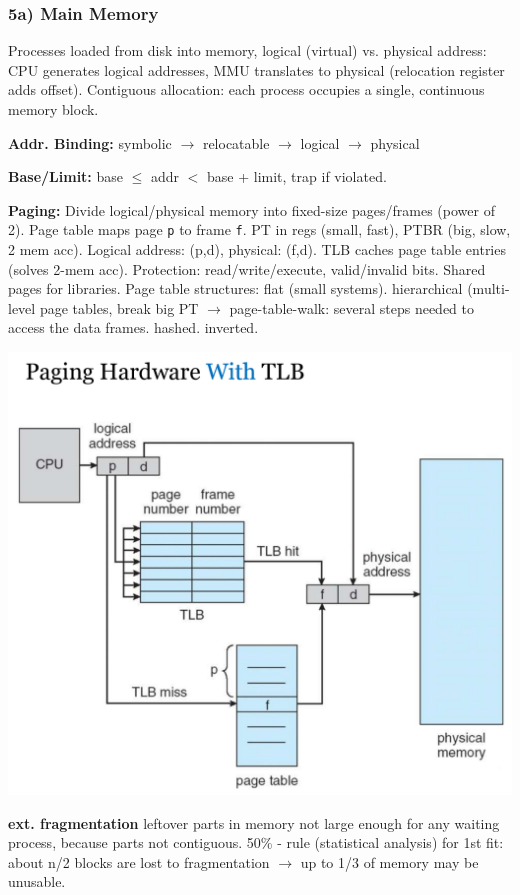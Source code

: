 \subsubsection*{5a) Main Memory}
Processes loaded from disk into memory, logical (virtual) vs. physical address: CPU generates logical addresses, MMU translates to physical (relocation register adds offset). Contiguous allocation: each process occupies a single, continuous memory block.

\textbf{Addr. Binding:} symbolic $\to$ relocatable $\to$ logical $\to$ physical

\textbf{Base/Limit:} base $\leq$ addr $<$ base + limit, trap if violated.

\textbf{Paging:} Divide logical/physical memory into fixed-size pages/frames (power of 2).
Page table maps page \texttt{p} to frame \texttt{f}.
PT in regs (small, fast), PTBR (big, slow, 2 mem acc).
Logical address: (p,d), physical: (f,d).
TLB caches page table entries (solves 2-mem acc).
Protection: read/write/execute, valid/invalid bits.
Shared pages for libraries.
Page table structures: flat (small systems).
hierarchical (multi-level page tables, break big PT $\to$ page-table-walk: several steps needed to access the data frames.
hashed. inverted.

\includegraphics[width=0.95\linewidth]{images/05a_p45_tlb.png}

\textbf{ext. fragmentation}
leftover parts in memory not large enough for any waiting process, because parts not contiguous.
50\% - rule (statistical analysis) for 1st fit: about n/2 blocks are lost to fragmentation $\to$ up to 1/3 of memory may be unusable.


